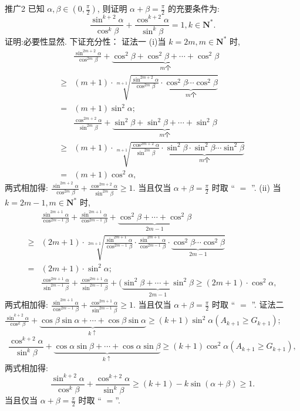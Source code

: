 推广2 已知 $\alpha, \beta \in\left(0, \frac{\pi}{2}\right)$, 则证明 $\alpha+\beta=\frac{\pi}{2}$ 的充要条件为:
$$
\frac{\sin ^{k+2} \alpha}{\cos ^k \beta}+\frac{\cos ^{k+2} \alpha}{\sin ^k \beta}=1, k \in \mathbf{N}^* .
$$
证明:必要性显然.
下证充分性：
证法一 (i)当 $k=2 m, m \in \mathbf{N}^*$ 时,
$$
\begin{aligned}
& \frac{\sin ^{2 m+2} \alpha}{\cos ^{2 m} \beta}+\underbrace{\cos ^2 \beta+\cos ^2 \beta+\cdots+\cos ^2 \beta}_{m 个} \\
\geqslant & (m+1) \cdot \sqrt[m+1]{\frac{\sin ^{2 m+2} \alpha}{\cos ^{2 m} \beta} \cdot \underbrace{\cos ^2 \beta \cdots \cos ^2 \beta}_{m 个}} \\
= & (m+1) \sin ^2 \alpha ; \\
& \frac{\cos ^{2 m+2} \alpha}{\sin ^{2 m} \beta}+\underbrace{\sin ^2 \beta+\sin ^2 \beta+\cdots+\sin ^2 \beta}_{m 个} \\
\geqslant & (m+1) \cdot \sqrt[m+1]{\frac{\cos ^{2 m+2} \alpha}{\sin ^{2 m} \beta} \cdot \underbrace{\sin ^2 \beta \cdot \sin ^2 \beta \cdots \sin ^2 \beta}_{m 个}} \\
= & (m+1) \cos ^2 \alpha,
\end{aligned}
$$
两式相加得: $\frac{\sin ^{2 m+2} \alpha}{\cos ^{2 m} \beta}+\frac{\cos ^{2 m+2} \alpha}{\sin ^{2 m} \beta} \geqslant 1$.
当且仅当 $\alpha+\beta=\frac{\pi}{2}$ 时取 “ $=$ ”.
(ii) 当 $k=2 m-1, m \in \mathbf{N}^*$ 时,
$$
\begin{aligned}
& \frac{\sin ^{2 m+1} \alpha}{\cos ^{2 m-1} \beta}+\frac{\sin ^{2 m+1} \alpha}{\cos ^{2 m-1} \beta}+\underbrace{\cos ^2 \beta+\cdots+\cos ^2 \beta}_{2 m-1} \\
\geqslant & (2 m+1) \cdot \sqrt[2 m+1]{\frac{\sin ^{2 m+1} \alpha}{\cos ^{2 m-1} \beta} \cdot \frac{\sin ^{2 m+1} \alpha}{\cos ^{2 m-1} \beta} \cdot \underbrace{\cos ^2 \beta \cdots \cos ^2 \beta}_{2 m-1}} \\
= & (2 m+1) \cdot \sin ^2 \alpha  ;\\
& \frac{\cos ^{2 m+1} \alpha}{\sin ^{2 m-1} \beta}+\frac{\cos ^{2 m+1} \alpha}{\sin ^{2 m-1} \beta} +(\underbrace{\sin ^2 \beta+\cdots+\sin ^2 \beta}_{2 m-1} \geqslant(2 m+1) \cdot \cos ^2 \alpha,
\end{aligned}
$$
两式相加得: $\frac{\sin ^{2 m+1} \alpha}{\cos ^{2 m-1} \beta}+\frac{\cos ^{2 m+1} \alpha}{\sin ^{2 m-1} \beta} \geqslant 1$.
当且仅当 $\alpha+\beta=\frac{\pi}{2}$ 时取 “ $=$ ”.
证法二 $\frac{\sin ^{k+2} \alpha}{\cos ^k \beta}+\underbrace{\cos \beta \sin \alpha+\cdots+\cos \beta \sin \alpha}_{k \uparrow} \geqslant(k+1) \sin ^2 \alpha\left(A_{k+1} \geqslant G_{k+1}\right)$;
$$
\frac{\cos ^{k+2} \alpha}{\sin ^k \beta}+\underbrace{\cos \alpha \sin \beta+\cdots+\cos \alpha \sin \beta}_{k \uparrow} \geqslant(k+1) \cos ^2 \alpha\left(A_{k+1} \geqslant G_{k+1}\right),
$$
两式相加得:
$$
\frac{\sin ^{k+2} \alpha}{\cos ^k \beta}+\frac{\cos ^{k+2} \alpha}{\sin ^k \beta} \geqslant(k+1)-k \sin (\alpha+\beta) \geqslant 1 .
$$
当且仅当 $\alpha+\beta=\frac{\pi}{2}$ 时取 “ $=$”.



